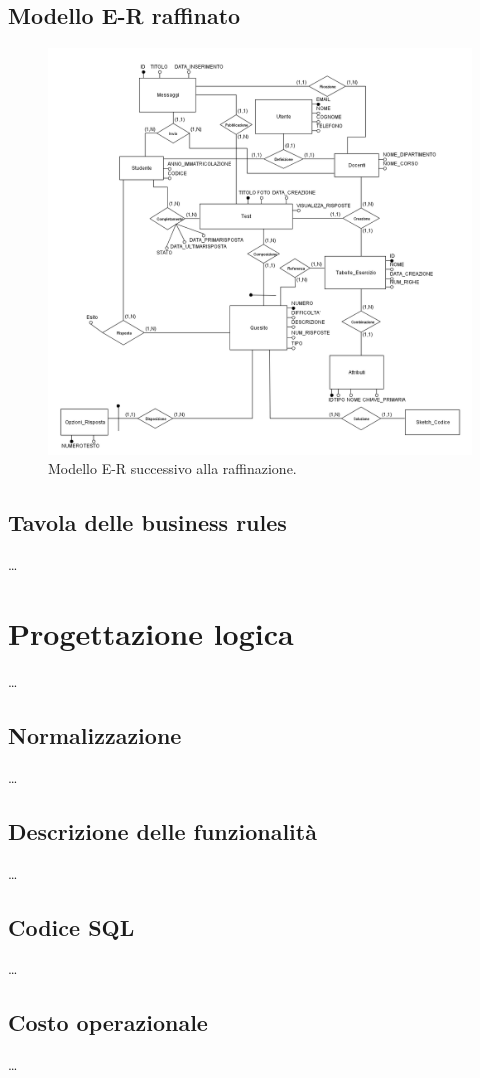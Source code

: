 \documentclass{article}
\begin{document}
\subsection{Modello E-R raffinato}
\large
\begin{figure}[H]
    \includegraphics*[width=1.1\textwidth]{foto2.png}
    \caption{Modello E-R successivo alla raffinazione.}
\end{figure}

\subsection{Tavola delle business rules}
\large
\dots

\section{Progettazione logica}
\large
\dots

\subsection{Normalizzazione}
\large
\dots

\subsection{Descrizione delle funzionalità}
\large
\dots

\subsection{Codice SQL}
\large
\dots

\subsection{Costo operazionale}
\large
\dots
\end{document}
